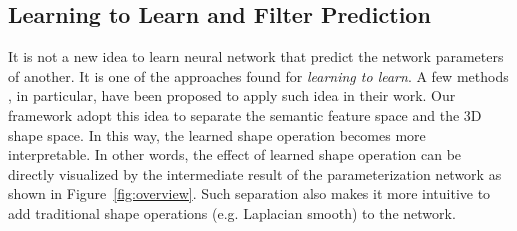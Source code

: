 \subsection{Learning to Learn and Filter Prediction}
It is not a new idea to learn neural network that predict the network parameters of another. It is one of the approaches found for \textit{learning to learn}. A few methods \cite{schmidhuber1992learning,bertinetto2016learning,jia2016dynamic} , in particular, have been proposed to apply such idea in their work. Our framework adopt this idea to separate the semantic feature space and the 3D shape space. In this way, the learned shape operation becomes more interpretable. In other words, the effect of learned shape operation can be directly visualized by the intermediate result of the parameterization network as shown in Figure~\ref{fig:overview}. Such separation also makes it more intuitive to add traditional shape operations (e.g. Laplacian smooth) to the network. 

